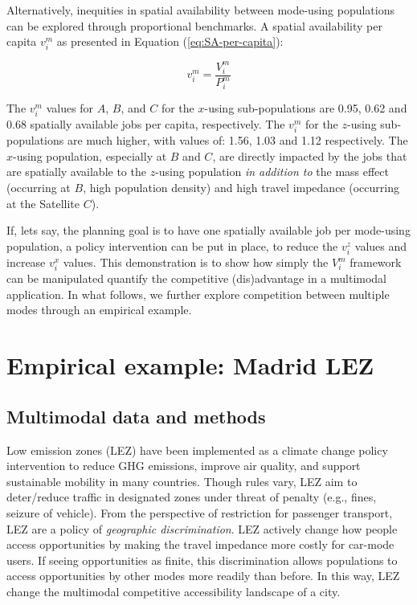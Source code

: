 \documentclass[]{trbunofficial}
\begin{document}
Alternatively, inequities in spatial availability between mode-using
populations can be explored through proportional benchmarks. A spatial
availability per capita \(v_i^m\) as presented in Equation
(\ref{eq:SA-per-capita}):

\begin{equation}
\label{eq:SA-per-capita}
v_{i}^m = \frac{V_{i}^m}{P_{i}^m}
\end{equation}

The \(v_i^m\) values for \(A\), \(B\), and \(C\) for the \(x\)-using
sub-populations are 0.95, 0.62 and 0.68 spatially available jobs per
capita, respectively. The \(v_i^m\) for the \(z\)-using sub-populations
are much higher, with values of: 1.56, 1.03 and 1.12 respectively. The
\(x\)-using population, especially at \(B\) and \(C\), are directly
impacted by the jobs that are spatially available to the \(z\)-using
population \emph{in addition to} the mass effect (occurring at \(B\),
high population density) and high travel impedance (occurring at the
Satellite \(C\)).

If, lets say, the planning goal is to have one spatially available job
per mode-using population, a policy intervention can be put in place, to
reduce the \(v_i^z\) values and increase \(v_i^x\) values. This
demonstration is to show how simply the \(V_i^m\) framework can be
manipulated quantify the competitive (dis)advantage in a multimodal
application. In what follows, we further explore competition between
multiple modes through an empirical example.

\hypertarget{empirical-example-madrid-lez}{%
\section{Empirical example: Madrid
LEZ}\label{empirical-example-madrid-lez}}

\hypertarget{multimodal-data-and-methods}{%
\subsection{Multimodal data and
methods}\label{multimodal-data-and-methods}}

Low emission zones (LEZ) have been implemented as a climate change
policy intervention to reduce GHG emissions, improve air quality, and
support sustainable mobility in many countries. Though rules vary, LEZ
aim to deter/reduce traffic in designated zones under threat of penalty
(e.g., fines, seizure of vehicle). From the perspective of restriction
for passenger transport, LEZ are a policy of \emph{geographic
discrimination}. LEZ actively change how people access opportunities by
making the travel impedance more costly for car-mode users. If seeing
opportunities as finite, this discrimination allows populations to
access opportunities by other modes more readily than before. In this
way, LEZ change the multimodal competitive accessibility landscape of a
city.
\end{document}
